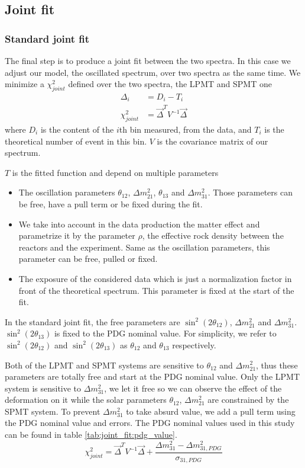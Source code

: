 \documentclass[../main.tex]{subfiles}
\begin{document}
\subsection{Joint fit}

\subsubsection{Standard joint fit}

The final step is to produce a joint fit between the two spectra. In this case we adjust our model, the oscillated spectrum, over two spectra as the same time. We minimize a $\chi^2_{joint}$ defined over the two spectra, the LPMT and SPMT one
\begin{align}
  \label{eq:joint_fit:pearson}
  \Delta_i &= D_{i} - T_{i} \\
  \chi^2_{joint} &= \vec{\Delta}^T V^{-1} \vec{\Delta}
\end{align}
where $D_{i}$ is the content of the $i$th bin measured, from the data, and $T_{i}$ is the theoretical number of event in this bin. $V$ is the covariance matrix of our spectrum.

$T$ is the fitted function and depend on multiple parameters
\begin{itemize}
  \item The oscillation parameters $\theta_{12}$, $\Delta m^2_{21}$, $\theta_{13}$ and $\Delta m^2_{31}$. Those parameters can be free, have a pull term or be fixed during the fit.
  \item We take into account in the data production the matter effect and parametrize it by the parameter $\rho$, the effective rock density between the reactors and the experiment. Same as the oscillation parameters, this parameter can be free, pulled or fixed.
  \item The exposure of the considered data which is just a normalization factor in front of the theoretical spectrum. This parameter is fixed at the start of the fit.
\end{itemize}

In the standard joint fit, the free parameters are $\sin^2(2\theta_{12})$, $\Delta m^2_{21}$ and $\Delta m^2_{31}$. $\sin^2(2\theta_{13})$ is fixed to the PDG nominal value. For simplicity, we refer to $\sin^2(2\theta_{12})$ and $\sin^2(2\theta_{13})$ as $\theta_{12}$ and $\theta_{13}$ respectively.

Both of the LPMT and SPMT systems are sensitive to $\theta_{12}$ and $\Delta m^2_{21}$, thus these parameters are totally free and start at the PDG nominal value. Only the LPMT system is sensitive to $\Delta m^2_{31}$, we let it free so we can observe the effect of the deformation on it while the solar parameters $\theta_{12}$, $\Delta m^2_{21}$ are constrained by the SPMT system. To prevent $\Delta m^2_{31}$ to take absurd value, we add a pull term using the PDG nominal value and errors. The PDG nominal values used in this study can be found in table \ref{tab:joint_fit:pdg_value}.
\begin{equation}
  \chi^2_{joint} = \vec{\Delta}^T V^{-1} \vec{\Delta} + \frac{\Delta m^2_{31} - \Delta m^2_{31,PDG}}{\sigma_{31, PDG}}
\end{equation}
\end{document}
